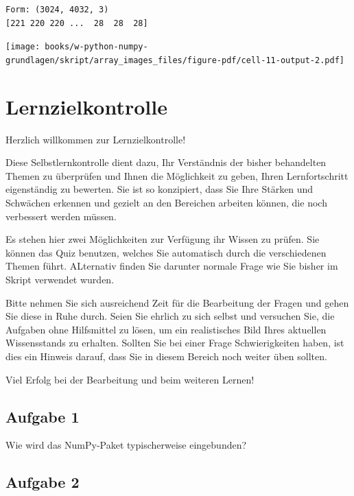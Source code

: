 \documentclass[
  letterpaper,
  DIV=11,
  numbers=noendperiod]{scrreprt}
\begin{document}
\begin{tcolorbox}
\begin{tcolorbox}
\begin{verbatim}
Form: (3024, 4032, 3)
[221 220 220 ...  28  28  28]
\end{verbatim}

\texttt{[image: books/w-python-numpy-grundlagen/skript/array\_images\_files/figure-pdf/cell-11-output-2.pdf]}

\end{tcolorbox}

\end{tcolorbox}

\chapter{Lernzielkontrolle}\label{lernzielkontrolle}

Herzlich willkommen zur Lernzielkontrolle!

Diese Selbstlernkontrolle dient dazu, Ihr Verständnis der bisher
behandelten Themen zu überprüfen und Ihnen die Möglichkeit zu geben,
Ihren Lernfortschritt eigenständig zu bewerten. Sie ist so konzipiert,
dass Sie Ihre Stärken und Schwächen erkennen und gezielt an den
Bereichen arbeiten können, die noch verbessert werden müssen.

Es stehen hier zwei Möglichkeiten zur Verfügung ihr Wissen zu prüfen.
Sie können das Quiz benutzen, welches Sie automatisch durch die
verschiedenen Themen führt. ALternativ finden Sie darunter normale Frage
wie Sie bisher im Skript verwendet wurden.

Bitte nehmen Sie sich ausreichend Zeit für die Bearbeitung der Fragen
und gehen Sie diese in Ruhe durch. Seien Sie ehrlich zu sich selbst und
versuchen Sie, die Aufgaben ohne Hilfsmittel zu lösen, um ein
realistisches Bild Ihres aktuellen Wissensstands zu erhalten. Sollten
Sie bei einer Frage Schwierigkeiten haben, ist dies ein Hinweis darauf,
dass Sie in diesem Bereich noch weiter üben sollten.

Viel Erfolg bei der Bearbeitung und beim weiteren Lernen!

\section*{Aufgabe 1}\label{aufgabe-1}


Wie wird das NumPy-Paket typischerweise eingebunden?

\section*{Aufgabe 2}\label{aufgabe-2}
\end{document}
